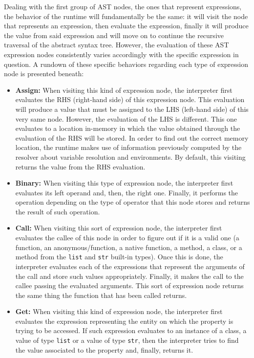 Dealing with the first group of AST nodes, the ones that represent expressions, the behavior of the runtime will fundamentally be the same: it will visit the node that represents an expression, then evaluate the expression, finally it will produce the value from said expression and will move on to continue the recursive traversal of the abstract syntax tree. 
However, the evaluation of these AST expression nodes consistently varies accordingly with the specific expression in question. A rundown of these specific behaviors regarding each type of expression node is presented beneath:
\begin{itemize}
    \item \textbf{Assign:} When visiting this kind of expression node, the interpreter first evaluates the RHS (right-hand side) of this expression node. This evaluation will produce a value that must be assigned to the LHS (left-hand side) of this very same node. However, the evaluation of the LHS is different. This one evaluates to a location in-memory in which the value obtained through the evaluation of the RHS will be stored. In order to find out the correct memory location, the runtime makes use of information previously computed by the resolver about variable resolution and environments. By default, this visiting returns the value from the RHS evaluation.
    \item \textbf{Binary:} When visiting this type of expression node, the interpreter first evaluates its left operand and, then, the right one. Finally, it performs the operation depending on the type of operator that this node stores and returns the result of such operation.
    \item \textbf{Call:} When visiting this sort of expression node, the interpreter first evaluates the callee of this node in order to figure out if it is a valid one (a function, an anonymous/function, a native function, a method, a class, or a method from the \texttt{list} and \texttt{str} built-in types). Once this is done, the interpreter evaluates each of the expressions that represent the arguments of the call and store such values appropriately. Finally, it makes the call to the callee passing the evaluated arguments. This sort of expression node returns the same thing the function that has been called returns.
    \item \textbf{Get:} When visiting this kind of expression node, the interpreter first evaluates the expression representing the entity on which the property is trying to be accessed. If such expression evaluates to an instance of a class, a value of type \texttt{list} or a value of type \texttt{str}, then the interpreter tries to find the value associated to the property and, finally, returns it.

\end{itemize}
